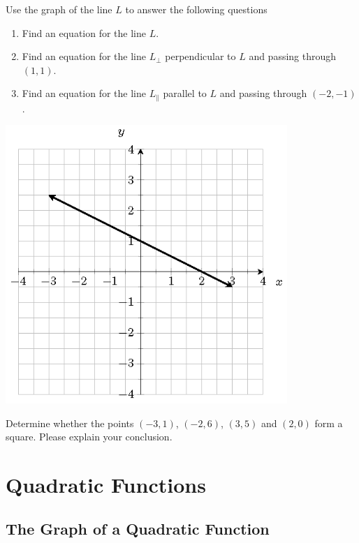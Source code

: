 \documentclass[en,12pt]{elegantbook}
\providecommand{\tightlist}{%
  \setlength{\itemsep}{0pt}\setlength{\parskip}{0pt}}
\let\BeginKnitrBlock\begin \let\EndKnitrBlock\end
\begin{document}
\BeginKnitrBlock{exercise}
\protect\hypertarget{exr:unnamed-chunk-279}{}{\label{exr:unnamed-chunk-279} }
Use the graph of the line \(L\) to answer the following questions

\begin{enumerate}
\def\labelenumi{\arabic{enumi}.}
\tightlist
\item
  Find an equation for the line \(L\).
\item
  Find an equation for the line \(L_\perp\) perpendicular to \(L\) and passing through \((1,1)\).
\item
  Find an equation for the line \(L_\parallel\) parallel to \(L\) and passing through \((-2,-1)\).
\end{enumerate}

\includegraphics[width=0.8\textwidth,height=\textheight]{figs/tikz-perp-prll-exercise.png}\\
\EndKnitrBlock{exercise}

\BeginKnitrBlock{exercise}
\protect\hypertarget{exr:unnamed-chunk-280}{}{\label{exr:unnamed-chunk-280} }
Determine whether the points \((-3,1)\), \((-2,6)\), \((3,5)\) and \((2, 0)\) form a square. Please explain your conclusion.
\EndKnitrBlock{exercise}

\hypertarget{quadratic-functions}{%
\chapter{Quadratic Functions}\label{quadratic-functions}}

\hypertarget{the-graph-of-a-quadratic-function}{%
\section{The Graph of a Quadratic Function}\label{the-graph-of-a-quadratic-function}}
\end{document}
